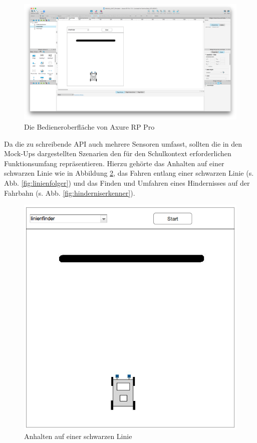 \documentclass[paper=a4, DIV=calc, BCOR=15mm, twoside=on, onecolumn=on, open = right, titlepage =on, parskip =half, headsepline = on, footsepline = on, chapterprefix = off, appendixprefix = off, fontsize = 12pt, numbers = noenddot, abstract = on]{scrbook}
\begin{document}
\begin{figure}[htbp]
\centering
\includegraphics[width=\textwidth]{images/axure_mockup.png} 
\caption{Die Bedieneroberfläche von Axure RP Pro}
\label{fig:axure}
\end{figure}

Da die zu schreibende API auch mehrere Sensoren umfasst, sollten die in den Mock-Ups dargestellten Szenarien den für den Schulkontext erforderlichen Funktionsumfang repräsentieren. Hierzu gehörte das Anhalten auf einer schwarzen Linie wie in Abbildung \ref{fig:linienfinder}, das Fahren entlang einer schwarzen Linie (s. Abb. \ref{fig:linienfolger}) und das Finden und Umfahren eines Hindernisses auf der Fahrbahn (s. Abb. \ref{fig:hinderniserkenner}).
\vfill


\begin{figure}[htbp]
\centering
\includegraphics[scale=0.5]{images/mockup_linienfinder.png}
\caption{Anhalten auf einer schwarzen Linie}
\label{fig:linienfinder}
\end{figure}
\end{document}
